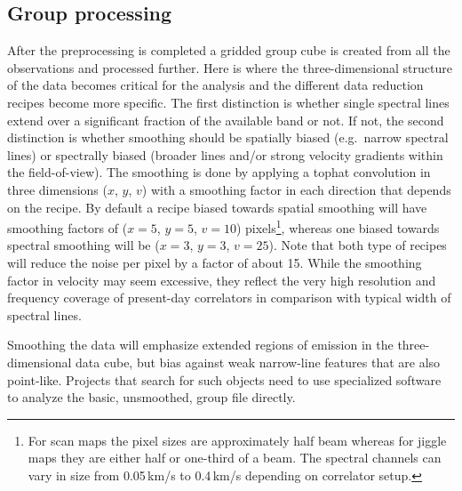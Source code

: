 \documentclass[final,authoryear,5p,times,twocolumn]{elsarticle}
\begin{document}
\subsection{Group processing}

After the preprocessing is completed a gridded group cube is created
from all the observations and processed further. Here is where the
three-dimensional structure of the data becomes critical for the analysis
and the different data reduction recipes become more specific. The first
distinction is whether single spectral lines extend over a significant
fraction of the available band or not. If not, the second distinction
is whether smoothing should be spatially biased (e.g.\ narrow spectral
lines) or spectrally biased (broader lines and/or strong velocity
gradients within the field-of-view). The smoothing is done by applying
a tophat convolution in three dimensions ($x$, $y$, $v$) with a smoothing
factor in each direction that depends on the recipe.  By default a
recipe biased towards spatial smoothing will have smoothing factors of
($x=5$, $y=5$, $v=10$) pixels\footnote{For scan maps the pixel sizes
  are approximately half beam whereas for jiggle maps they are either
  half or one-third of a beam. The spectral channels can vary in size
  from 0.05\,km/s to 0.4\,km/s depending on correlator setup.},
 whereas one biased towards spectral smoothing
will be ($x=3$, $y=3$, $v=25$). Note that both type of recipes will reduce
the noise per pixel by a factor of about 15. While the smoothing
factor in velocity may seem excessive, they reflect the very high
resolution and frequency coverage of present-day correlators in
comparison with typical width of spectral lines.

Smoothing the data will emphasize extended regions of emission in the
three-dimensional data cube, but bias against weak narrow-line features that are also
point-like. Projects that search for such objects need to use specialized
software to analyze the basic, unsmoothed, group file directly.
\end{document}

